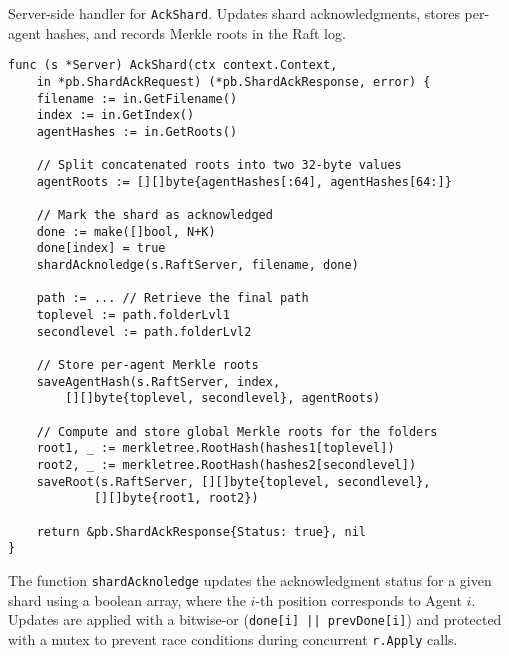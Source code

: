 \begin{listing}[H]
\caption{Server-side handler for \texttt{AckShard}. Updates shard acknowledgments, stores per-agent hashes, and records Merkle roots in the Raft log.}
\label{code:ack-shard}
\begin{verbatim}
func (s *Server) AckShard(ctx context.Context,
    in *pb.ShardAckRequest) (*pb.ShardAckResponse, error) {
    filename := in.GetFilename()
    index := in.GetIndex()
    agentHashes := in.GetRoots()

    // Split concatenated roots into two 32-byte values
    agentRoots := [][]byte{agentHashes[:64], agentHashes[64:]}

    // Mark the shard as acknowledged
    done := make([]bool, N+K)
    done[index] = true
    shardAcknoledge(s.RaftServer, filename, done)

    path := ... // Retrieve the final path
    toplevel := path.folderLvl1
    secondlevel := path.folderLvl2

    // Store per-agent Merkle roots
    saveAgentHash(s.RaftServer, index,
        [][]byte{toplevel, secondlevel}, agentRoots)

    // Compute and store global Merkle roots for the folders
    root1, _ := merkletree.RootHash(hashes1[toplevel])
    root2, _ := merkletree.RootHash(hashes2[secondlevel])
    saveRoot(s.RaftServer, [][]byte{toplevel, secondlevel},
            [][]byte{root1, root2})

    return &pb.ShardAckResponse{Status: true}, nil
}
\end{verbatim}
\end{listing}

The function \texttt{shardAcknoledge} updates the acknowledgment status for a
given shard using a boolean array, where the $i$-th position corresponds to
Agent $i$. Updates are applied with a bitwise-or (\texttt{done[i] || prevDone[i]}) and protected with a mutex to prevent race conditions during concurrent \texttt{r.Apply} calls.

